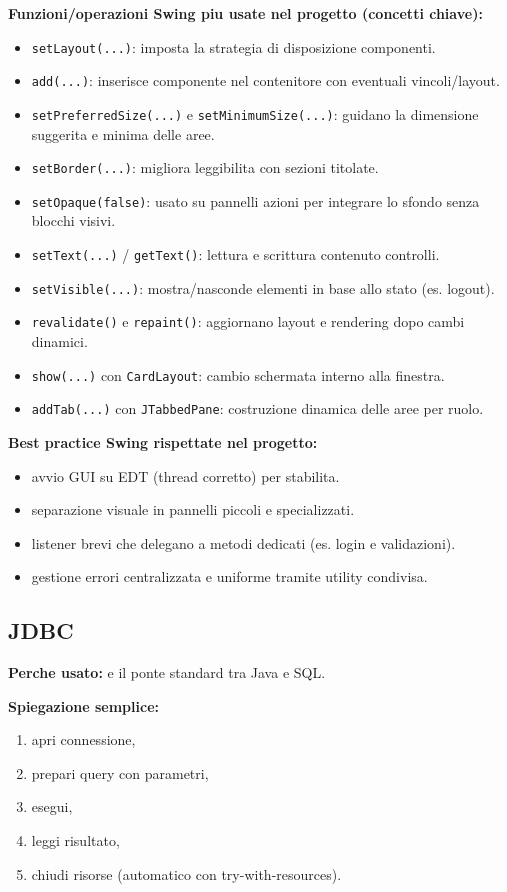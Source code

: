 \documentclass[12pt,a4paper]{article}
\begin{document}
\textbf{Funzioni/operazioni Swing piu usate nel progetto (concetti chiave):}
\begin{itemize}
  \item \texttt{setLayout(...)}: imposta la strategia di disposizione componenti.
  \item \texttt{add(...)}: inserisce componente nel contenitore con eventuali vincoli/layout.
  \item \texttt{setPreferredSize(...)} e \texttt{setMinimumSize(...)}: guidano la dimensione suggerita e minima delle aree.
  \item \texttt{setBorder(...)}: migliora leggibilita con sezioni titolate.
  \item \texttt{setOpaque(false)}: usato su pannelli azioni per integrare lo sfondo senza blocchi visivi.
  \item \texttt{setText(...)} / \texttt{getText()}: lettura e scrittura contenuto controlli.
  \item \texttt{setVisible(...)}: mostra/nasconde elementi in base allo stato (es. logout).
  \item \texttt{revalidate()} e \texttt{repaint()}: aggiornano layout e rendering dopo cambi dinamici.
  \item \texttt{show(...)} con \texttt{CardLayout}: cambio schermata interno alla finestra.
  \item \texttt{addTab(...)} con \texttt{JTabbedPane}: costruzione dinamica delle aree per ruolo.
\end{itemize}

\textbf{Best practice Swing rispettate nel progetto:}
\begin{itemize}
  \item avvio GUI su EDT (thread corretto) per stabilita.
  \item separazione visuale in pannelli piccoli e specializzati.
  \item listener brevi che delegano a metodi dedicati (es. login e validazioni).
  \item gestione errori centralizzata e uniforme tramite utility condivisa.
\end{itemize}

\subsection{JDBC}
\textbf{Perche usato:} e il ponte standard tra Java e SQL.

\textbf{Spiegazione semplice:}
\begin{enumerate}
  \item apri connessione,
  \item prepari query con parametri,
  \item esegui,
  \item leggi risultato,
  \item chiudi risorse (automatico con try-with-resources).
\end{enumerate}
\end{document}
